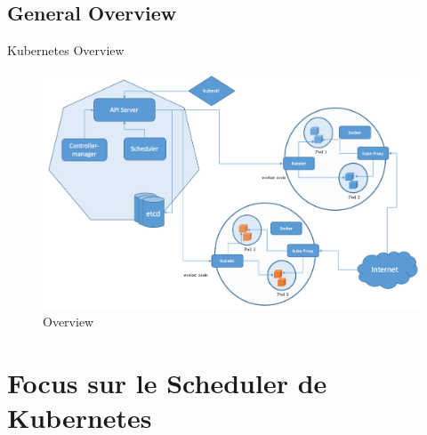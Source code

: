 \documentclass{bredelebeamer}
\begin{document}
\subsection{General Overview}
\begin{frame}{Kubernetes Overview}
\begin{figure}
\centering
\includegraphics[scale=0.37]{images/img24.png}
\caption{Overview}
\end{figure}
\end{frame}



\section{Focus sur le Scheduler de Kubernetes }
\end{document}
